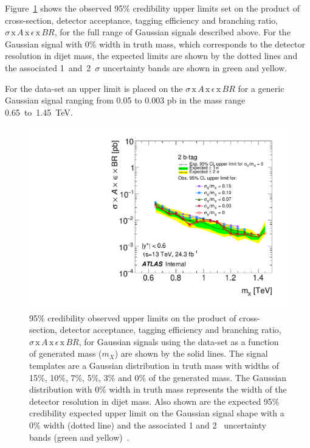 Figure~\ref{fig:lim-lowmass_gauss} shows the observed 95\% credibility upper limits set 
on the product of cross-section, detector acceptance, tagging efficiency and branching ratio,
$\sigma\,\text{x}\,\mathit{A}\,\text{x}\,\epsilon\,\text{x}\,\mathit{BR}$,
for the full range of Gaussian signals described above.
For the Gaussian signal with 0\% width in truth mass, which corresponds to the detector resolution in dijet mass,
the expected limits are shown by the dotted lines and the associated 1~and~2~$\sigma$ uncertainty bands are shown in green and yellow.

For the \lm{} data-set an upper limit is placed on the $\sigma\,\text{x}\,\mathit{A}\,\text{x}\,\epsilon\,\text{x}\,\mathit{BR}$
for a generic Gaussian signal ranging from 0.05 to 0.003 pb in the mass range 0.65~to~1.45~TeV.

\begin{figure}[!ht]
  \begin{center}
    \includegraphics[width=0.9\linewidth, angle=0]{figs/Dibjet/lowmass/lim-gaussian.pdf}
  \vspace{-1.5em}
  \end{center}
  \caption[95\% credibility upper limits
    on the product of cross-section, detector acceptance, tagging efficiency and branching ratio
    for Gaussian signals using the \lm{} data-set.]
  {95\% credibility observed upper limits
    on the product of cross-section, detector acceptance, tagging efficiency and branching ratio,
    $\sigma\,\text{x}\,\mathit{A}\,\text{x}\,\epsilon\,\text{x}\,\mathit{BR}$,
    for Gaussian signals using the \lm{} data-set as a function of generated mass ($m_X$) are shown by the solid lines.
    The signal templates are a Gaussian distribution in truth mass with
    widths of 15\%, 10\%, 7\%, 5\%, 3\% and 0\% of the generated mass.
    The Gaussian distribution with 0\% width in truth mass represents the width of the detector resolution in dijet mass.
    Also shown are the expected 95\% credibility expected upper limit on the Gaussian signal shape with a 0\% width (dotted line)
    and the associated 1 and 2~\sigma{} uncertainty bands (green and yellow)~\cite{dibjet-full}.
  }
  \label{fig:lim-lowmass_gauss}
\end{figure}

